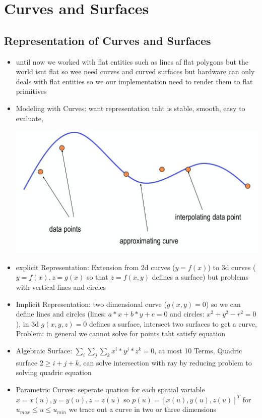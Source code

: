 \documentclass[11pt,a4paper]{article}
\begin{document}
\section{Curves and Surfaces}
	\subsection{Representation of Curves and Surfaces}
	\begin{itemize}
		\item until now we worked with flat entities such as lines af flat polygons but the world isnt flat so wee need curves and curved surfaces but hardware can only deals with flat entities so we our implementation need to render them to flat primitives
		\item Modeling with Curves: want representation taht is stable, smooth, easy to evaluate,
		\begin{center}
			\includegraphics[scale=0.5]{pictures/curves.jpg}
		\end{center}
		\item explicit Representation: Extension from 2d curves ($y=f(x)$) to 3d curves ($y=f(x),z=g(x)$ so that $z=f(x,y)$ defines a surface) but problems with vertical lines and circles
		\item Implicit Representation: two dimensional curve ($g(x,y)=0$) so we can define lines and circles (lines: $a*x+b*y+c=0$ and circles: $x^{2}+y^{2}-r^{2}=0$), in 3d $g(x,y,z)=0$ defines a surface, intersect two surfaces to get a curve, Problem: in general we cannot solve for points taht satisfy equation
		\item Algebraic Surface: $\sum_{i}\sum_{j}\sum_{k}x^{i}*y^{j}*z^{k}=0$, at most 10 Terms, Quadric surface $2 \geq i+j+k$, can solve intersection with ray by reducing problem to solving quadric equation
		\item Parametric Curves: seperate quation for each spatial variable $x=x(u),y=y(u),z=z(u)$ so $p(u)=[x(u),y(u),z(u)]^{T}$ for $u_{max} \leq u \leq u_{min}$ we trace out a curve in two or three dimensions
	\end{itemize}
\end{document}
